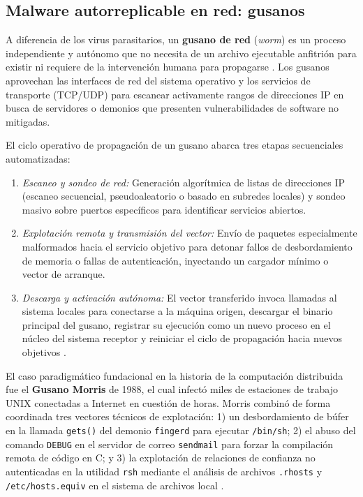\documentclass[12pt]{article}
\begin{document}
\subsection{Malware autorreplicable en red: gusanos}\label{subsec:malwareAutorreplicableGusanos}

A diferencia de los virus parasitarios, un \textbf{gusano de red} (\textit{worm}) es un proceso independiente y autónomo que no necesita de un archivo ejecutable anfitrión para existir ni requiere de la intervención humana para propagarse \parencite[\S 15.3.1, p.\ 521]{silberschatz2006fundamentos}. Los gusanos aprovechan las interfaces de red del sistema operativo y los servicios de transporte (TCP/UDP) para escanear activamente rangos de direcciones IP en busca de servidores o demonios que presenten vulnerabilidades de software no mitigadas.

El ciclo operativo de propagación de un gusano abarca tres etapas secuenciales automatizadas:
\begin{enumerate}[noitemsep, topsep=2pt]
    \item \textit{Escaneo y sondeo de red:} Generación algorítmica de listas de direcciones IP (escaneo secuencial, pseudoaleatorio o basado en subredes locales) y sondeo masivo sobre puertos específicos para identificar servicios abiertos.
    \item \textit{Explotación remota y transmisión del vector:} Envío de paquetes especialmente malformados hacia el servicio objetivo para detonar fallos de desbordamiento de memoria o fallas de autenticación, inyectando un cargador mínimo o vector de arranque.
    \item \textit{Descarga y activación autónoma:} El vector transferido invoca llamadas al sistema locales para conectarse a la máquina origen, descargar el binario principal del gusano, registrar su ejecución como un nuevo proceso en el núcleo del sistema receptor y reiniciar el ciclo de propagación hacia nuevos objetivos \parencite[\S 15.3.1, p.\ 522]{silberschatz2006fundamentos}.
\end{enumerate}

El caso paradigmático fundacional en la historia de la computación distribuida fue el \textbf{Gusano Morris} de 1988, el cual infectó miles de estaciones de trabajo UNIX conectadas a Internet en cuestión de horas. Morris combinó de forma coordinada tres vectores técnicos de explotación: 1) un desbordamiento de búfer en la llamada \texttt{gets()} del demonio \texttt{fingerd} para ejecutar \texttt{/bin/sh}; 2) el abuso del comando \texttt{DEBUG} en el servidor de correo \texttt{sendmail} para forzar la compilación remota de código en C; y 3) la explotación de relaciones de confianza no autenticadas en la utilidad \texttt{rsh} mediante el análisis de archivos \texttt{.rhosts} y \texttt{/etc/hosts.equiv} en el sistema de archivos local \parencite[\S 15.3.1, pp.\ 521--522]{silberschatz2006fundamentos}.
\end{document}
